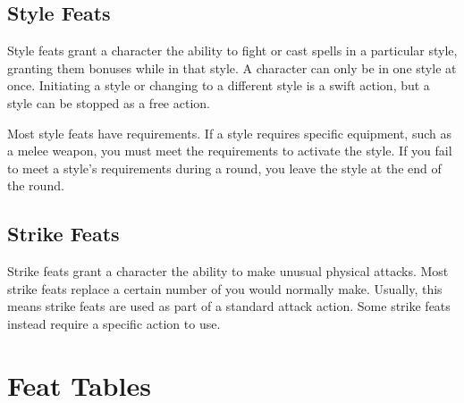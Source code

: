 \subsection{Style Feats}
Style feats grant a character the ability to fight or cast spells in a particular style, granting them bonuses while in that style.
A character can only be in one style at once.
Initiating a style or changing to a different style is a swift action, but a style can be stopped as a free action.

Most style feats have requirements.
If a style requires specific equipment, such as a melee weapon, you must meet the requirements to activate the style.
If you fail to meet a style's requirements during a round, you leave the style at the end of the round.

\subsection{Strike Feats}\label{Strike Feats}
Strike feats grant a character the ability to make unusual physical attacks.
Most strike feats replace a certain number of  you would normally make.
Usually, this means strike feats are used as part of a standard attack action.
Some strike feats instead require a specific action to use.

\section{Feat Tables}
\onecolumn

